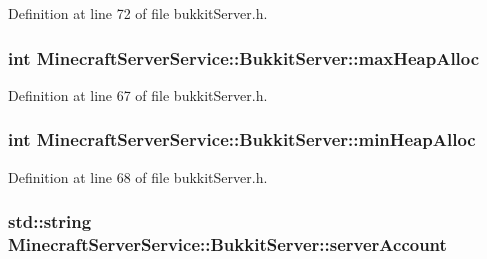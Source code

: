 Definition at line 72 of file bukkit\+Server.\+h.

\subsubsection[{\texorpdfstring{max\+Heap\+Alloc}{maxHeapAlloc}}]{\setlength{\rightskip}{0pt plus 5cm}int Minecraft\+Server\+Service\+::\+Bukkit\+Server\+::max\+Heap\+Alloc\hspace{0.3cm}{\ttfamily [protected]}}\hypertarget{class_minecraft_server_service_1_1_bukkit_server_ad8916f8d6fcf0df8922519ba2df42977}{}\label{class_minecraft_server_service_1_1_bukkit_server_ad8916f8d6fcf0df8922519ba2df42977}


Definition at line 67 of file bukkit\+Server.\+h.

\subsubsection[{\texorpdfstring{min\+Heap\+Alloc}{minHeapAlloc}}]{\setlength{\rightskip}{0pt plus 5cm}int Minecraft\+Server\+Service\+::\+Bukkit\+Server\+::min\+Heap\+Alloc\hspace{0.3cm}{\ttfamily [protected]}}\hypertarget{class_minecraft_server_service_1_1_bukkit_server_a62ebcb90b98dc041c7c819a8af39c320}{}\label{class_minecraft_server_service_1_1_bukkit_server_a62ebcb90b98dc041c7c819a8af39c320}


Definition at line 68 of file bukkit\+Server.\+h.

\subsubsection[{\texorpdfstring{server\+Account}{serverAccount}}]{\setlength{\rightskip}{0pt plus 5cm}std\+::string Minecraft\+Server\+Service\+::\+Bukkit\+Server\+::server\+Account\hspace{0.3cm}{\ttfamily [protected]}}\hypertarget{class_minecraft_server_service_1_1_bukkit_server_af39cd743eeb5c6daccdbe07de59b6b44}{}\label{class_minecraft_server_service_1_1_bukkit_server_af39cd743eeb5c6daccdbe07de59b6b44}


